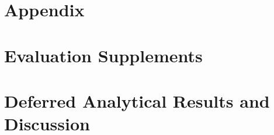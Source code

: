 \section*{Appendix}

\section{Evaluation Supplements}


\section{Deferred Analytical Results and Discussion}

